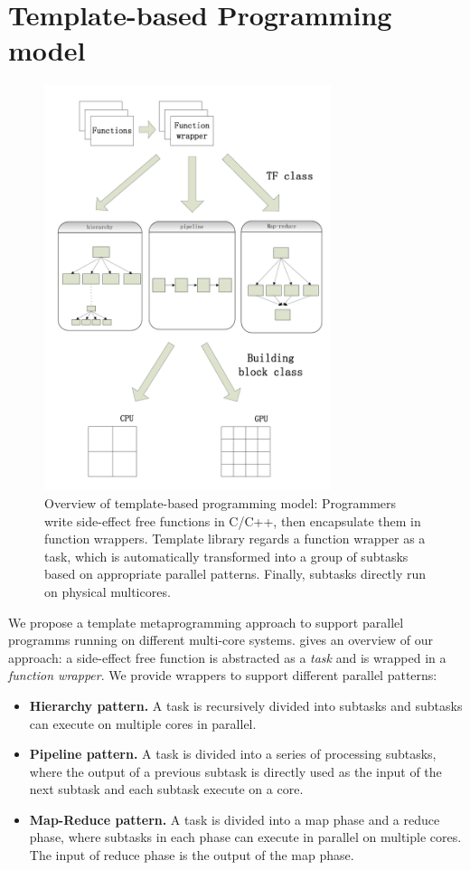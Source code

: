 \section{Template-based Programming model}
\label{sec:model}

\begin{figure}[htb]
\includegraphics[width=3.3in]{../overview}
\caption{Overview of template-based programming model: Programmers
write side-effect free functions in C/C++, then encapsulate them in
function wrappers. Template library regards a function wrapper as
a task, which is automatically transformed into a
group of subtasks based on appropriate parallel patterns. Finally,
subtasks directly run on physical multicores.}
\label{fig:overview}
\end{figure}

We propose a template metaprogramming approach to support parallel programms
running on different multi-core systems.  gives an overview
of our approach: a side-effect free function is abstracted as a \emph{task}
and is wrapped in a \emph{function wrapper}. We provide wrappers
to support different parallel patterns:

\begin{itemize}
\item \textbf{Hierarchy pattern.} A task is recursively divided into subtasks
and subtasks can execute on multiple cores in parallel.

\item \textbf{Pipeline pattern.} A task is divided into a series of processing
subtasks, where the output of a previous subtask is directly used as the input
of the next subtask and each subtask execute on a core.

\item \textbf{Map-Reduce pattern.} A task is divided into a map phase and a
reduce phase, where subtasks in each phase can execute in parallel on multiple
cores. The input of reduce phase is the output of the map phase.

\end{itemize}


